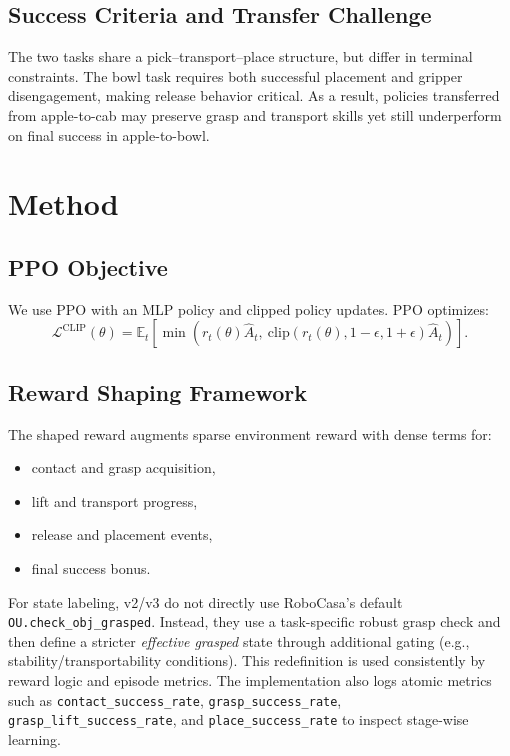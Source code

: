 \documentclass[11pt]{article}
\begin{document}
\subsection{Success Criteria and Transfer Challenge}
The two tasks share a pick--transport--place structure, but differ in terminal
constraints. The bowl task requires both successful placement and gripper
disengagement, making release behavior critical. As a result, policies transferred
from apple-to-cab may preserve grasp and transport skills yet still underperform on
final success in apple-to-bowl.

\section{Method}

\subsection{PPO Objective}
We use PPO with an MLP policy and clipped policy updates. PPO optimizes:
\begin{equation*}
  \mathcal{L}^{\text{CLIP}}(\theta) = \mathbb{E}_t \left[ \min\!\left(
  r_t(\theta)\hat{A}_t,\ \mathrm{clip}(r_t(\theta), 1-\epsilon, 1+\epsilon)\hat{A}_t
  \right) \right] .
\end{equation*}

\subsection{Reward Shaping Framework}
The shaped reward augments sparse environment reward with dense terms for:
\begin{itemize}
  \item contact and grasp acquisition,
  \item lift and transport progress,
  \item release and placement events,
  \item final success bonus.
\end{itemize}

For state labeling, v2/v3 do not directly use RoboCasa's default
\texttt{OU.check\_obj\_grasped}. Instead, they use a task-specific robust grasp
check and then define a stricter \emph{effective grasped} state through additional
gating (e.g., stability/transportability conditions). This redefinition is used
consistently by reward logic and episode metrics. The implementation also logs
atomic metrics such as \texttt{contact\_success\_rate},
\texttt{grasp\_success\_rate}, \texttt{grasp\_lift\_success\_rate}, and
\texttt{place\_success\_rate} to inspect stage-wise learning.
\end{document}
